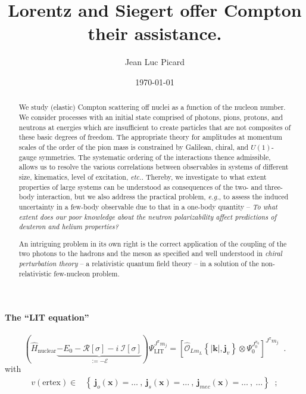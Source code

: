 \documentclass[onecolumn,preprint,superscriptaddress,nofootinbib,notitlepage,10pt,linenumbers]{revtex4-1}
\newcommand{\eg}{\textit{e.g.}\;}
\newcommand{\be}{\begin{equation}}
\newcommand{\ee}{\end{equation}}
\newcommand{\la}{\label}
\newcommand{\ve}[1]{\ensuremath{\boldsymbol{#1}}}
\newcommand{\bet}[1] {\left|#1\right|}
\newcommand{\re}[1] {\mathcal{R}\left[#1\right]}
\newcommand{\im}[1] {\mathcal{I}\left[#1\right]}
\newcommand{\E}{\mathcal{E}}
\begin{document}
\title{Lorentz and Siegert offer Compton their assistance.}
\author{Jean Luc Picard}
\date{\today}

\begin{abstract}
We study (elastic) Compton scattering off nuclei as a function of the
nucleon number. We consider processes with an initial state comprised of
photons, pions, protons, and neutrons at energies which are insufficient to
create particles that are not composites of these basic degrees of freedom.
The appropriate theory for amplitudes at momentum scales of the order of the pion mass
is constrained by Galilean, chiral, and $U(1)$-gauge symmetries.
The systematic ordering of the interactions thence admissible, allows us to
resolve the various correlations between observables in systems of different
size, kinematics, level of excitation, {\it etc.}. Thereby, we investigate to what
extent properties of large systems can be understood as consequences of the
two- and three-body interaction, but we also address the practical problem, \eg,
to assess the induced uncertainty in a few-body observable due to that in a
one-body quantity -- {\it To what extent does our poor knowledge about the neutron
polarizability affect predictions of deuteron and helium properties?}

An intriguing problem in its own right is the correct application of the
coupling of the two photons to the hadrons and the meson as specified and well
understood in {\it chiral perturbation theory} -- a relativistic quantum field theory --
in a solution of the non-relativistic few-nucleon problem.
\end{abstract}



\paragraph{The ``LIT equation''}
\be\la{eq.liteq}
\left(\hat{H}_\text{nuclear}\underbrace{-E_0-\re{\sigma}-i~\im{\sigma}}_{:=-\E}\right)\Psi_\text{LIT}^{J^\pi m_j}=
\left[\hat{\mathcal{O}}_{Lm_L}\left\lbrace\bet{\ve{k}},\ve{j}_{v}\right\rbrace\otimes\Psi_0^{J_0^{\pi_0}}\right]^{J^\pi m_j}\;\;.
\ee
with
\begin{align}\la{eq.liteq.descr}
v(\text{ertex})\in&\left\lbrace~\ve{j}_o(\ve{x})=\ldots~,~\ve{j}_s(\ve{x})=\ldots~,~\ve{j}_{mec}(\ve{x})=\ldots~,~\ldots\right\rbrace\;\;;
\end{align}
\end{document}
